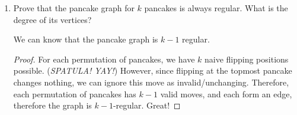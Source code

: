 \begin{enumerate}[leftmargin=*]
\begin{solution}
    Let us explain by pseudocode. Let us us the basic repetitive functions along with FLIP(X) to flip right under X. Also let VAL(X) be the size of the pancake at the position $X$. 
    \newline
    \newline
    ALGORITHM SORT-PANCAKES
    \newline
    FOR ALL X IN ORDER FROM ($N\cdots 1$):
    \newline   
    $\rightarrow$ FLIP(N)
    \newline
    $\rightarrow$ FLIP(VAL(X)
\end{solution}
\color{red}Maybe a non-pseudocode explanation would actually help more here, but this algorithm works. How long does it take to complete?\color{black}

\item Prove that the pancake graph for $k$ pancakes is always regular. What is the degree of its vertices?
\begin{solution}
We can know that the pancake graph is $k-1$ regular. 
\end{solution}
\begin{proof}
For each permutation of pancakes, we have $k$ naive flipping positions possible. \newline(\textit{SPATULA! YAY!}) However, since flipping at the topmost pancake changes nothing, we can ignore this move as invalid/unchanging. Therefore, each permutation of pancakes has $k-1$ valid moves, and each form an edge, therefore the graph is $k-1$-regular. \color{red}Great!\color{black}


\end{proof}
\end{enumerate}
